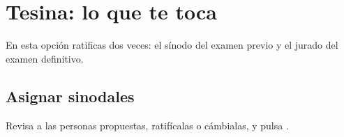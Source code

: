 \section{Tesina: lo que te toca}
En esta opción ratificas dos veces: el sínodo del examen previo y el jurado del examen definitivo.
\subsection{Asignar sinodales}
Revisa a las personas propuestas, ratifícalas o cámbialas, y pulsa .
